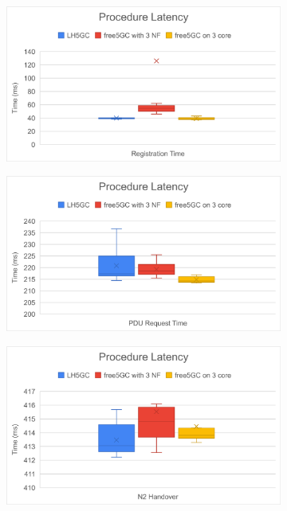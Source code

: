 \begin{figure}[htb]
    \centering
    \begin{subfigure}[b]{.5\linewidth}
        \centering
        \includegraphics[height=!,width=0.95\linewidth,keepaspectratio=true]{figures/cp_proc_reg}
        \caption[]{{\footnotesize}}
        \label{fig:cp_proc_reg}
    \end{subfigure}%
    \begin{subfigure}[b]{.5\linewidth}
        \centering
        \includegraphics[height=!,width=0.95\linewidth,keepaspectratio=true]{figures/cp_proc_sess}
        \caption[]{{\footnotesize}}
        \label{fig:cp_proc_sess}
    \end{subfigure}
    \begin{subfigure}[b]{.5\linewidth}
        \centering
        \includegraphics[height=!,width=0.95\linewidth,keepaspectratio=true]{figures/cp_proc_ho}

\end{subfigure}
\end{figure}
